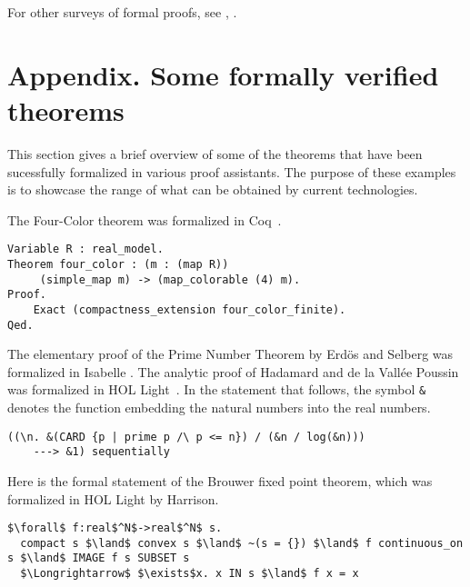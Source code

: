 \documentclass[brochure,english,12pt]{bourbaki}
\theoremstyle{plain}
\begin{document}
For other  surveys of formal proofs, see  \cite{avigad2014formally}, \cite{Hales:2008:formal}.

\section{Appendix. Some formally verified theorems}


This section gives a brief overview of some of the theorems that have been sucessfully formalized
in various proof assistants.  The purpose of these examples is to showcase the range
of what can be obtained by current technologies.


The Four-Color theorem was formalized in Coq~\cite{gonthier2008formal}.



\begin{lstlisting}[keepspaces=true,stringstyle=\tt,basicstyle=\small,frame=single,framesep=8pt,morekeywords={Variable,Theorem,Proof,Qed},columns=flexible]
Variable R : real_model. 
Theorem four_color : (m : (map R))
     (simple_map m) -> (map_colorable (4) m). 
Proof.
    Exact (compactness_extension four_color_finite). 
Qed.
\end{lstlisting}


The elementary proof of the Prime Number Theorem by Erd\"os and Selberg was formalized in Isabelle \cite{avigad2007formally}.  
The analytic proof of Hadamard and de la Vall\'ee Poussin
was formalized in HOL Light~\cite{harrison2009formalizing}. In the statement that follows, the symbol \verb!&! denotes the
function embedding the natural numbers into the real numbers. 

\begin{lstlisting}[keepspaces=true,stringstyle=\tt,basicstyle=\small,frame=single,framesep=8pt,mathescape,morekeywords={theorem,fixes,assumes,defines,shows,Variable,Theorem,Proof,Qed},columns=flexible]
  ((\n. &(CARD {p | prime p /\ p <= n}) / (&n / log(&n)))
    ---> &1) sequentially
\end{lstlisting}

Here is the formal statement of the Brouwer fixed point theorem, which was formalized in HOL Light by Harrison.

\begin{lstlisting}[keepspaces=true,stringstyle=\tt,basicstyle=\small,frame=single,framesep=8pt,mathescape,morekeywords={theorem,fixes,assumes,defines,shows,Variable,Theorem,Proof,Qed},columns=flexible]
  $\forall$ f:real$^N$->real$^N$ s. 
  compact s $\land$ convex s $\land$ ~(s = {}) $\land$ f continuous_on s $\land$ IMAGE f s SUBSET s
  $\Longrightarrow$ $\exists$x. x IN s $\land$ f x = x
\end{lstlisting}
\end{document}
